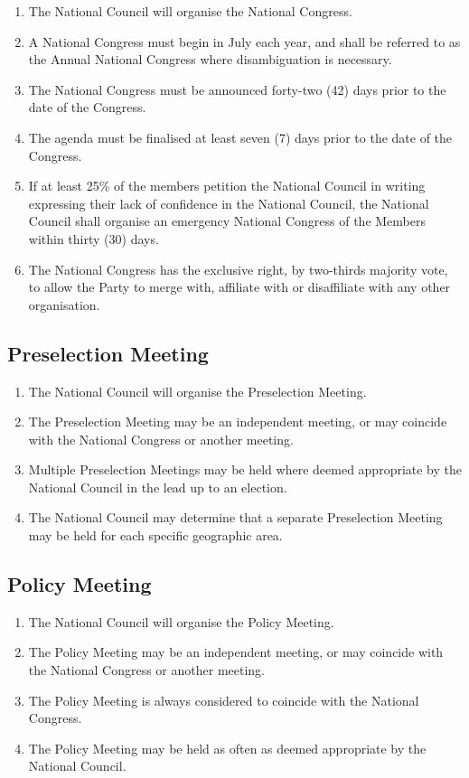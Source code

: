 \documentclass[a4paper,titlepage,8.5pt]{article}
\begin{document}
\begin{enumerate}
\item The National Council will organise the National Congress.
\item A National Congress must begin in July each year, and shall be referred to as the Annual National Congress where disambiguation is necessary.
\item The National Congress must be announced forty-two (42) days prior to the date of the Congress.
\item The agenda must be finalised at least seven (7) days prior to the date of the Congress.
\item If at least 25\% of the members petition the National Council in writing expressing their lack of confidence in the National Council, the National Council shall organise an emergency National Congress of the Members within thirty (30) days.
\item The National Congress has the exclusive right, by two-thirds majority vote, to allow the Party to merge with, affiliate with or disaffiliate with any other organisation.
\end{enumerate}

\subsection{Preselection Meeting}

\begin{enumerate}
\item The National Council will organise the Preselection Meeting.
\item The Preselection Meeting may be an independent meeting, or may coincide with the National Congress or another meeting.
\item Multiple Preselection Meetings may be held where deemed appropriate by the National Council in the lead up to an election.
\item The National Council may determine that a separate Preselection Meeting may be held for each specific geographic area.
\end{enumerate}

\subsection{Policy Meeting}

\begin{enumerate}
\item The National Council will organise the Policy Meeting.
\item The Policy Meeting may be an independent meeting, or may coincide with the National Congress or another meeting.
\item The Policy Meeting is always considered to coincide with the National Congress.
\item The Policy Meeting may be held as often as deemed appropriate by the National Council.
\end{enumerate}
\end{document}
